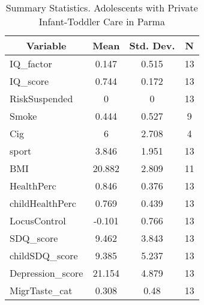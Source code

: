 
\begin{table}[htbp]\centering \caption{Summary Statistics. Adolescents with Private Infant-Toddler Care in Parma \label{bothAdolasiloPrivParma}}
\begin{tabular}{l c c  c}\hline\hline
\multicolumn{1}{c}{\textbf{Variable}} & \textbf{Mean}
 & \textbf{Std. Dev.} & \textbf{N}\\ \hline
IQ\_factor & 0.147 & 0.515  & 13\\
IQ\_score & 0.744 & 0.172  & 13\\
RiskSuspended & 0 & 0  & 13\\
Smoke & 0.444 & 0.527  & 9\\
Cig & 6 & 2.708  & 4\\
sport & 3.846 & 1.951  & 13\\
BMI & 20.882 & 2.809  & 11\\
HealthPerc & 0.846 & 0.376  & 13\\
childHealthPerc & 0.769 & 0.439  & 13\\
LocusControl & -0.101 & 0.766  & 13\\
SDQ\_score & 9.462 & 3.843  & 13\\
childSDQ\_score & 9.385 & 5.237  & 13\\
Depression\_score & 21.154 & 4.879  & 13\\
MigrTaste\_cat & 0.308 & 0.48  & 13\\
\hline\end{tabular}
\end{table}

